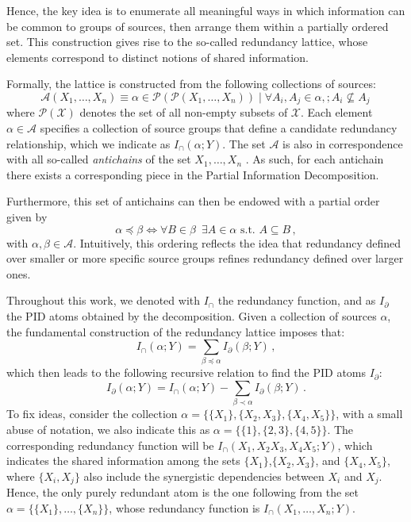 \documentclass{article}
\newcommand{\Xs}{X_1,\ldots,X_n}
\newcommand{\Ic}{\ensuremath{I_\cap}\xspace}
\begin{document}
Hence, the key idea is to enumerate all meaningful ways in which information can be common to groups of sources, then arrange them within a partially ordered set. This construction gives rise to the so-called redundancy lattice, whose elements correspond to distinct notions of shared information.

Formally, the lattice is constructed from the following collections of sources:
\begin{equation}
\mathcal{A}(\Xs) \equiv { \alpha \in \mathcal{P}(\mathcal{P}(\Xs)) \mid \forall A_i,A_j \in \alpha,; A_i \not\subseteq A_j } \,
\end{equation}
where $\mathcal{P}(\mathcal{X})$ denotes the set of all non-empty subsets of $\mathcal{X}$. Each element $\alpha \in \mathcal{A}$ specifies a collection of source groups that define a candidate redundancy relationship, which we indicate as $\Ic(\alpha;Y)$.
The set $\mathcal{A}$ is also in correspondence with all so-called \textit{antichains} of the set ${X_1,\ldots, X_n}$ \cite{dilworth1990decomposition}. As such, for each antichain there exists a corresponding piece in the Partial Information Decomposition.

Furthermore, this set of antichains can then be endowed with a partial order given by 
\begin{equation}
    \alpha \preceq \beta \iff \forall B \in \beta \,\,\,\exists A\in\alpha \text{ s.t. } A\subseteq B \,,
\end{equation}
with $\alpha,\beta \in \mathcal{A}$. Intuitively, this ordering reflects the idea that redundancy defined over smaller or more specific source groups refines redundancy defined over larger ones.

Throughout this work, we denoted with \Ic the redundancy function, and as $I_\partial$ the PID atoms obtained by the decomposition. Given a collection of sources $\alpha$, the fundamental construction of the redundancy lattice imposes that:
\begin{equation} \label{eq:pid_lattice_defeq}
    \Ic(\alpha;Y) = \sum_{\beta\preceq\alpha} I_\partial(\beta;Y) \,,
\end{equation}
which then leads to the following recursive relation to find the PID atoms $I_\partial$:
\begin{equation}
    I_\partial(\alpha;Y) = \Ic(\alpha;Y) - \sum_{\beta\prec\alpha} I_\partial(\beta;Y) \,.
\end{equation}
To fix ideas, consider the collection $\alpha=\{\{X_1\},\{X_2,X_3\},\{X_4, X_5\}\}$, with a small abuse of notation, we also indicate this as $\alpha=\{\{1\},\{2,3\},\{4 ,5\}\}$. The corresponding redundancy function will be $\Ic(X_1,X_2X_3,X_4 X_5;Y)$, which indicates the shared information among the sets $\{X_1\}$,$\{X_2,X_3\}$, and $\{X_4,X_5\}$, where $\{X_i,X_j\}$ also include the synergistic dependencies between $X_i$ and $X_j$.
Hence, the only purely redundant atom is the one following from the set $\alpha=\{\{X_1\},\ldots,\{X_n\}\}$, whose redundancy function is $\Ic(\Xs;Y)$.
\end{document}
